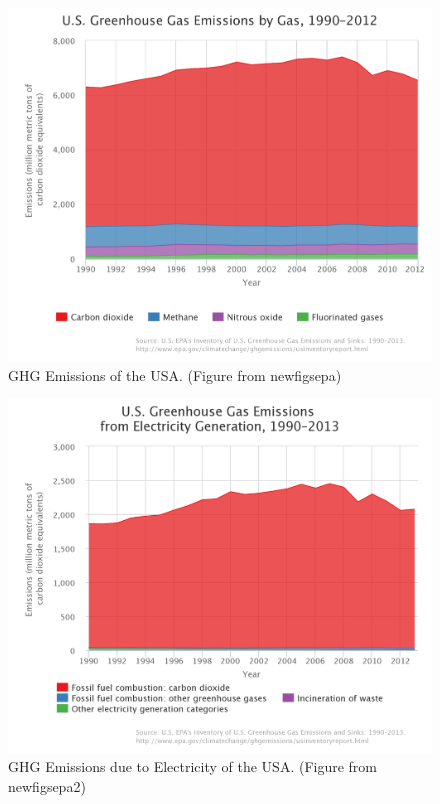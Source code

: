 \begin{figure}
\begin{center}
\includegraphics[scale=0.6]{pics/new_d1.pdf}
\caption{GHG Emissions of the USA. (Figure from \cite{debbie}{newfigsepa})}
\label{d1}
\end{center}
\end{figure}

\begin{figure}
\begin{center}
\includegraphics[scale=0.35]{pics/chart.png}
\caption{GHG Emissions due to Electricity of the USA. (Figure from \cite{debbie}{newfigsepa2})}
\label{d1}
\end{center}
\end{figure}

